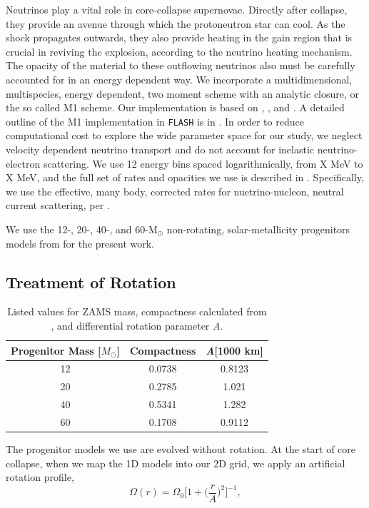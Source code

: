\documentclass[twocolumn,times]{aastex62}  %
\newcommand{\Msun}{\ensuremath{\mathrm{M}_\odot}\xspace}
\begin{document}
Neutrinos play a vital role in core-collapse supernovae.  Directly after collapse, they provide an avenue through which the protoneutron star can cool.  As the shock propagates outwards, they also provide heating in the gain region that is crucial in reviving the explosion, according to the neutrino heating mechanism.  The opacity of the material to these outflowing neutrinos also must be carefully accounted for in an energy dependent way.  We incorporate a multidimensional, multispecies, energy dependent, two moment scheme with an analytic closure, or the so called M1 scheme.  Our implementation is based on \citet{oconnor:2015}, \citet{shibata:2011}, and \citet{cardall:2013}.  A detailed outline of the M1 implementation in \texttt{FLASH} is in \citet{oconnor:2018}.  In order to reduce computational cost to explore the wide parameter space for our study, we neglect velocity dependent neutrino transport and do not account for inelastic neutrino-electron scattering.
We use 12 energy bins spaced logarithmically, from X MeV to X MeV, and the full set of rates and opacities we use is described in \citet{oconnor:2017a}. 
Specifically, we use the effective, many body, corrected rates
for nuetrino-nucleon, neutral current scattering, per \citet{horowitz:2017}.  

We use the 12-, 20-, 40-, and 60-\Msun non-rotating, solar-metallicity progenitors models from \citet{Suk:2016} for the present work.

\subsection{Treatment of Rotation}


\begin{table}[t]
\begin{tabular}{c|c|c}
Progenitor Mass [$M_\odot$] & Compactness & \textit{A}[1000 km] \\
\hline
12  & 0.0738 &         0.8123             \\
20  & 0.2785 &         1.021            \\
40  & 0.5341 &         1.282           \\
60  & 0.1708 &         0.9112          
\end{tabular}
\caption{Listed values for ZAMS mass, compactness calculated from \citet{Suk:2016}, and differential rotation parameter \textit{A}.}
\label{table:compact}
\end{table}

The progenitor models we use are evolved without rotation.
At the start of core collapse, when we map the 1D models into our 2D grid, we apply an artificial rotation profile,
\begin{equation}
    \Omega(r) = \Omega_0 \bigg[1 + \bigg(\frac{r}{A}\bigg)^2 \bigg]^{-1}, 
    \label{eq:omega}
\end{equation}
\end{document}
